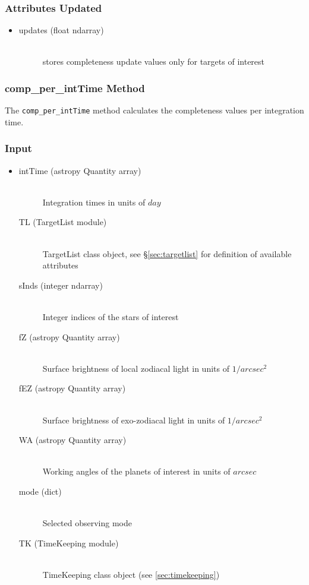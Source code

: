 \documentclass[cleanfoot]{asme2ej}
\begin{document}
\subsubsection*{Attributes Updated}
\begin{itemize}
\item
\begin{description}
    \item[updates (float ndarray)] \hfill \\ stores completeness update values only for targets of interest
\end{description}
\end{itemize}

\subsubsection{comp\_per\_intTime Method}\label{sec:compperintTime}
The \verb+comp_per_intTime+ method calculates the completeness values per integration time.
\subsubsection*{Input}
\begin{itemize}
\item 
\begin{description}
    \item[intTime (astropy Quantity array)] \hfill \\ Integration times in units of $ day $
    \item[TL (TargetList module)] \hfill \\ TargetList class object, see \S\ref{sec:targetlist} for definition of available attributes
    \item[sInds (integer ndarray)] \hfill \\ Integer indices of the stars of interest
    \item[fZ (astropy Quantity array)] \hfill \\ Surface brightness of local zodiacal light in units of $ 1/arcsec^2 $
    \item[fEZ (astropy Quantity array)] \hfill \\ Surface brightness of exo-zodiacal light in units of $ 1/arcsec^2 $
    \item[WA (astropy Quantity array)] \hfill \\ Working angles of the planets of interest in units of $ arcsec $
    \item[mode (dict)] \hfill \\ Selected observing mode
    \item[TK (TimeKeeping module)] \hfill \\ TimeKeeping class object (see \ref{sec:timekeeping})
\end{description}
\end{itemize}
\end{document}
